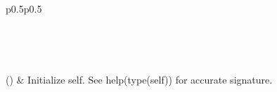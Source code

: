 \documentclass[letterpaper,10pt,english]{sphinxmanual}
\begin{document}
\begin{savenotes}\sphinxatlongtablestart\begin{longtable}[c]{p{0.5\linewidth}p{0.5\linewidth}}
\hline

\endfirsthead

%
{}\\
\hline

\endhead

\hline
{}\\
\endfoot

\endlastfoot

{\hyperref[\detokenize{autoapi/pine/pipelines/NER_API/index:pine.pipelines.NER_API.ner_api}]{}}()
&
Initialize self.  See help(type(self)) for accurate signature.
\\
\hline
\end{longtable}\sphinxatlongtableend\end{savenotes}

\begin{fulllineitems}
\label{\detokenize{autoapi/pine/pipelines/NER_API/index:pine.pipelines.NER_API.logger}}
\end{fulllineitems}


\begin{fulllineitems}
\label{\detokenize{autoapi/pine/pipelines/NER_API/index:pine.pipelines.NER_API.config}}
\end{fulllineitems}

\end{document}
